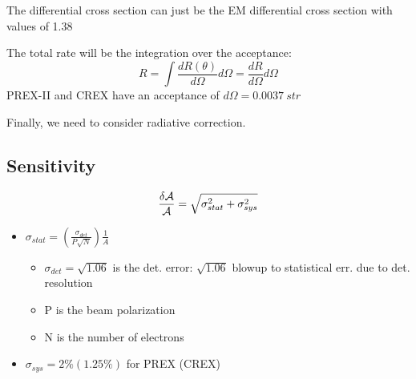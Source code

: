 The differential cross section can just be the EM differential cross section
with values of 1.38 

The total rate will be the integration over the acceptance:
\begin{equation}
    R = \int \frac{dR(\theta)}{d\Omega} d\Omega = \frac{dR}{d\Omega} d\Omega
\end{equation}
PREX-II and CREX have an acceptance of $d\Omega = 0.0037 \ str$

Finally, we need to consider radiative correction.




\begin{comment}
    The measured asymmetry will be:
    \begin{equation*}
	\CA = \frac{2\pi}{R} \int \CA_0(\theta)R(\theta)d\theta
    \end{equation*}

    Define sensitivity as:
    \begin{equation*}
	S(\theta) = \frac{|\CA_0(\theta) - \CA_1(\theta)|}{\CA_0(\theta)}
    \end{equation*}
    where $\CA_1$ is the asym. for 1\% change in radius. Then we can 
    calculate the total sensitivity:
    \begin{equation*}
	S = \frac{2\pi}{R} \int S(\theta)R(\theta)d\theta
    \end{equation*}

    For PREX-II: average sensitivity reduced by 5\% due to ${}^{12}C$ contamination
    For CREX: average sensitivity reduced by 10\% due to ${}^{40}Ca$ contamination
\end{comment}

\subsection{Sensitivity}
\begin{equation*}
    \frac{\delta\mathcal{A}}{\mathcal{A}} = \sqrt{\sigma_{stat}^2 + \sigma_{sys}^2}
\end{equation*}
\begin{itemize}
    \item $\sigma_{stat} = \left(\frac{\sigma_{det}}{P\sqrt{N}}\right) \frac{1}{A}$
	\begin{itemize}
	    \item $\sigma_{det} = \sqrt{1.06}$ is the det. error: $\sqrt{1.06}$ blowup to statistical err. due to det. resolution
	    \item P is the beam polarization
	    \item N is the number of electrons
	\end{itemize}
    \item $\sigma_{sys} = 2\% (1.25\%)$ for PREX (CREX)
\end{itemize}

